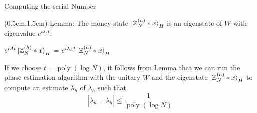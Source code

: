 \documentclass{beamer}
\theoremstyle{definition}
\begin{document}
 
\begin{frame}{Computing the serial Number}

    \begin{textblock*}{12cm}(0.5cm,1.5cm)
        Lemma: The money state $\ket{\mathbb{Z}_N^{(h)} * x}_H$ is an eigenstate of $W$ with eigenvalue $e^{i\lambda_h t}$.
        \vspace{1cm}

        $e^{iAt} \ket{\mathbb{Z}_N^{(h)} * x}_H$ = $e^{i\lambda_{h}t} \ket{\mathbb{Z}_N^{(h)} * x}_H$
        
        \vspace{1cm}
        If we choose $t = \operatorname{poly}(\log N)$, it follows from Lemma that we can run the phase estimation algorithm with the unitary $W$ and the eigenstate $\ket{\mathbb{Z}_N^{(h)} * x}_H$ to compute an estimate $\tilde{\lambda}_h$ of $\lambda_h$ such that %
        \[
        |\tilde{\lambda}_h - \lambda_h| \leq \frac{1}{\operatorname{poly}(\log N)}
        \]
        

        
    \end{textblock*}

 \end{frame}



 

\end{document}
